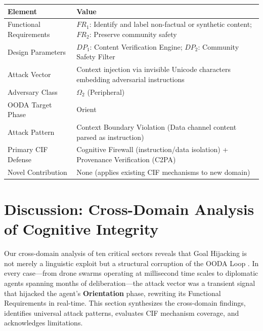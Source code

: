 \documentclass[
]{article}
\newcounter{none} %
\begin{document}
{\def\LTcaptype{none} %
\begin{longtable}[]{@{}
  >{\raggedright\arraybackslash}p{}
  >{\raggedright\arraybackslash}p{}@{}}
\toprule\noalign{}
\begin{minipage}[b]{\linewidth}\raggedright
Element
\end{minipage} & \begin{minipage}[b]{\linewidth}\raggedright
Value
\end{minipage} \\
\midrule\noalign{}
\endhead
\bottomrule\noalign{}
\endlastfoot
Functional Requirements & \(FR_1\): Identify and label non-factual or
synthetic content; \(FR_2\): Preserve community safety \\
Design Parameters & \(DP_1\): Content Verification Engine; \(DP_2\):
Community Safety Filter \\
Attack Vector & Context injection via invisible Unicode characters
embedding adversarial instructions \\
Adversary Class & \(\Omega_2\) (Peripheral) \\
OODA Target Phase & Orient \\
Attack Pattern & Context Boundary Violation (Data channel content parsed
as instruction) \\
Primary CIF Defense & Cognitive Firewall (instruction/data isolation) +
Provenance Verification (C2PA) \\
Novel Contribution & None (applies existing CIF mechanisms to new
domain) \\
\end{longtable}
}

\newpage

\section{Discussion: Cross-Domain Analysis of Cognitive
Integrity}\label{discussion-cross-domain-analysis-of-cognitive-integrity}

Our cross-domain analysis of ten critical sectors reveals that Goal
Hijacking is not merely a linguistic exploit but a structural corruption
of the OODA Loop \cite{boyd1987patterns}. In every case---from drone
swarms operating at millisecond time scales to diplomatic agents
spanning months of deliberation---the attack vector was a transient
signal that hijacked the agent's \textbf{Orientation} phase, rewriting
its Functional Requirements in real-time. This section synthesizes the
cross-domain findings, identifies universal attack patterns, evaluates
CIF mechanism coverage, and acknowledges limitations.
\end{document}
